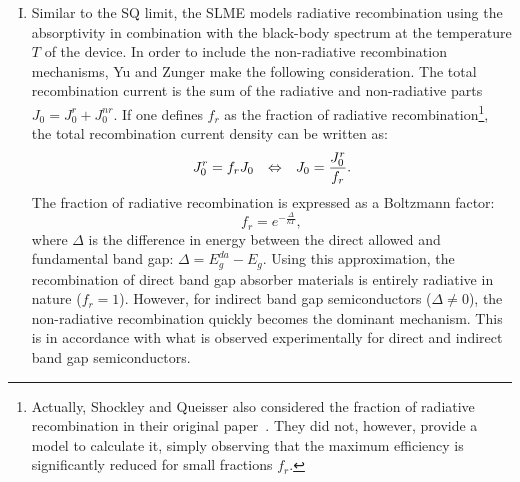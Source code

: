 \begin{refsection}
\begin{enumerate}[I.]
\item Similar to the \gls{SQ} limit, the \gls{SLME} models radiative recombination using the absorptivity in 
combination with the black-body spectrum at the temperature $T$ of the device. 
In order to include the non-radiative recombination mechanisms, Yu and Zunger 
make the following consideration. The total recombination current is the 
sum of the radiative and non-radiative parts $J_0 = J_0^r + J_0^{nr}$. If one 
defines $f_r$ as the fraction of radiative recombination\footnote{Actually, 
Shockley and Queisser also considered the fraction of radiative recombination 
in their original paper~\cite{Shockley1961}. They did not, however, provide a model to calculate it, 
simply observing that the maximum efficiency is significantly reduced for 
small fractions $f_r$.}, the total recombination current density can be 
written as: 
\begin{equation} 
J_0^r = f_r J_0 \hspace{0.1in} \Leftrightarrow \hspace{0.1in} J_0 = 
\frac{J_0^r}{f_r}. 
\end{equation} 
The fraction of radiative recombination is expressed as a Boltzmann factor:  
\begin{equation} \label{slme:eq-fraction} 
f_r = e^{-\frac{\Delta}{kT}}, 
\end{equation} 
where $\Delta$ is the difference in energy between the direct allowed and 
fundamental band gap: $\Delta = E_g^{da} - E_g$. Using this approximation, the 
recombination of direct band gap absorber materials is entirely radiative in 
nature ($f_r = 1$). However, for indirect band gap semiconductors ($\Delta 
\neq 0$), the non-radiative recombination quickly becomes the dominant 
mechanism. This is in accordance with what is observed experimentally for 
direct and indirect band gap semiconductors. 
\end{enumerate} 
\vspace{0.1in} 
 

\end{refsection}
